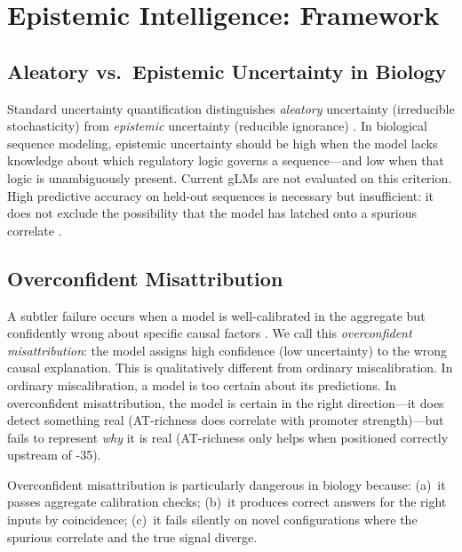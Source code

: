 \documentclass{article}
\begin{document}
\section{Epistemic Intelligence: Framework}
\label{sec:background}

\subsection{Aleatory vs.\ Epistemic Uncertainty in Biology}

Standard uncertainty quantification distinguishes \emph{aleatory}
uncertainty (irreducible stochasticity) from \emph{epistemic} uncertainty
(reducible ignorance) \citep{gal2016uncertainty,guo2017calibration}.
In biological sequence modeling, epistemic uncertainty should be high when
the model lacks knowledge about which regulatory logic governs a
sequence---and low when that logic is unambiguously present.
Current gLMs are not evaluated on this criterion.
High predictive accuracy on held-out sequences is necessary but
insufficient: it does not exclude the possibility that the model has
latched onto a spurious correlate \citep{ovadia2019can}.

\subsection{Overconfident Misattribution}

A subtler failure occurs when a model is well-calibrated in the aggregate
but confidently wrong about specific causal factors
\citep{d2020underspecification}.
We call this \emph{overconfident misattribution}: the model assigns high
confidence (low uncertainty) to the wrong causal explanation.
This is qualitatively different from ordinary miscalibration.
In ordinary miscalibration, a model is too certain about its predictions.
In overconfident misattribution, the model is certain in the right
direction---it does detect something real (AT-richness does correlate with
promoter strength)---but fails to represent \emph{why} it is real
(AT-richness only helps when positioned correctly upstream of -35).

Overconfident misattribution is particularly dangerous in biology because:
(a)~it passes aggregate calibration checks; (b)~it produces correct answers
for the right inputs by coincidence; (c)~it fails silently on novel
configurations where the spurious correlate and the true signal diverge.
\end{document}
